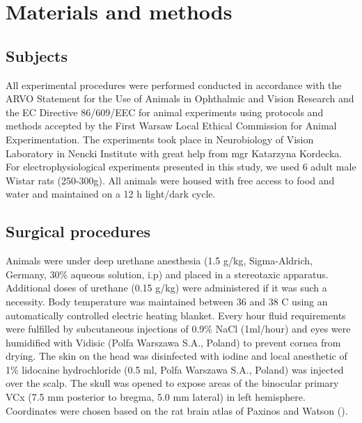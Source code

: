 \documentclass{pracalicmgr}
\begin{document}
\chapter{Materials and methods}   
 	\section{Subjects}
 	All experimental procedures  were performed conducted in accordance with the ARVO Statement for the Use of Animals in Ophthalmic and Vision Research and  the EC Directive 86/609/EEC for animal experiments using protocols and methods accepted by the First Warsaw Local Ethical Commission for Animal Experimentation. The experiments took place in Neurobiology of Vision Laboratory in Nencki Institute with great help from mgr Katarzyna Kordecka.
 	For electrophysiological experiments presented in this study, we used 6 adult male Wistar rats (250-300g). All animals were housed with free access to food and water and maintained on a 12 h light/dark cycle.
 	
 	\section{Surgical procedures}
 	Animals were under deep urethane anesthesia (1.5 g/kg, Sigma-Aldrich, Germany, 30\% aqueous solution, i.p) and placed in a stereotaxic apparatus. Additional doses of urethane (0.15 g/kg) were administered if it was such a necessity. Body temperature was maintained between 36 and 38 \degree C using an automatically controlled electric heating blanket. Every hour fluid requirements were fulfilled by subcutaneous injections of 0.9\% NaCl (1ml/hour) and eyes were humidified with Vidisic (Polfa Warszawa S.A., Poland) to prevent cornea from drying. The skin on the head was disinfected with iodine and local anesthetic of 1\% lidocaine hydrochloride (0.5 ml, Polfa Warszawa S.A., Poland) was injected over the scalp. The skull was opened to expose areas of the binocular primary VCx (7.5 mm posterior to bregma, 5.0 mm lateral) in left hemisphere. Coordinates were chosen based on the rat brain atlas of Paxinos and Watson (\cite{atlas}). 
 	
\end{document}
